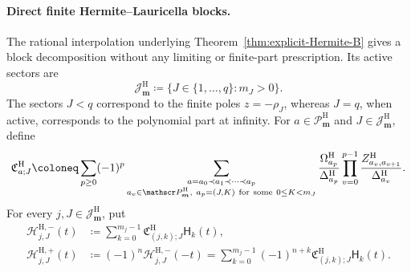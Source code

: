 \documentclass[10pt]{amsart}
\newcommand{\mm}{\boldsymbol m}
\theoremstyle{plain}
\theoremstyle{definition}
\theoremstyle{remark}
\begin{document}
\paragraph{Direct finite Hermite--Lauricella blocks.}
The rational interpolation underlying
Theorem~\ref{thm:explicit-Hermite-B} gives a block decomposition without
any limiting or finite-part prescription. Its active sectors are
\[
 \mathcal J_{\mm}^{\mathrm H}
 \coloneq\{J\in\{1,\ldots,q\}:m_J>0\}.
\]
The sectors \(J<q\) correspond to the finite poles
\(z=-\rho_J\), whereas \(J=q\), when active, corresponds to the
polynomial part at infinity. For
\(a\in\mathscr P_{\mm}^{\mathrm H}\) and
\(J\in\mathcal J_{\mm}^{\mathrm H}\), define
\begin{equation}
 \mathfrak C_{a;J}^{\mathrm H}
 \coloneq
 \sum_{p\ge0}(-1)^p
 \sum_{\substack{a=a_0\prec a_1\prec\cdots\prec a_p\\
                  a_v\in\mathscr P_{\mm}^{\mathrm H},\
                  a_p=(J,K)\ {\rm for\ some}\ 0\le K<m_J}}
 \frac{\Omega_{a_p}^{\mathrm H}}{\Delta_{a_p}^{\mathrm H}}
 \prod_{v=0}^{p-1}
 \frac{Z_{a_v,a_{v+1}}^{\mathrm H}}
      {\Delta_{a_v}^{\mathrm H}}.
 \label{eq:Hermite-sector-path-coefficients}
\end{equation}
For every \(j,J\in\mathcal J_{\mm}^{\mathrm H}\), put
\begin{align}
 \mathscr H_{j,J}^{\mathrm H,-}(t)
 &\coloneq
 \sum_{k=0}^{m_j-1}
 \mathfrak C_{(j,k);J}^{\mathrm H}\mathsf H_k(t),
 \label{eq:Hermite-minus-direct-block}\\
 \mathscr H_{j,J}^{\mathrm H,+}(t)
 &\coloneq(-1)^n\mathscr H_{j,J}^{\mathrm H,-}(-t)
 =\sum_{k=0}^{m_j-1}(-1)^{n+k}
 \mathfrak C_{(j,k);J}^{\mathrm H}\mathsf H_k(t).
 \label{eq:Hermite-plus-direct-block}
\end{align}
\end{document}
